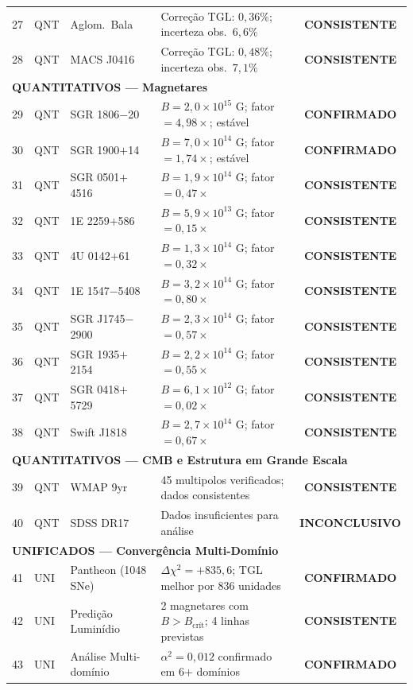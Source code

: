 \documentclass[12pt,a4paper,twoside]{article}
\newcommand{\alphaii}{\alpha^{2}}
\newcommand{\confirmed}{\textcolor{tglgreen}{\textbf{CONFIRMADO}}}
\newcommand{\consistent}{\textcolor{tglblue}{\textbf{CONSISTENTE}}}
\newcommand{\inconclusive}{\textcolor{tglgray}{\textbf{INCONCLUSIVO}}}
\begin{document}
\begin{small}
\begin{longtable}{clp{3.5cm}p{4.5cm}c}
27 & QNT & Aglom.\ Bala          & Corre\c{c}\~ao TGL: $0{,}36\%$; incerteza obs.\ $6{,}6\%$  & \consistent \\
28 & QNT & MACS J0416            & Corre\c{c}\~ao TGL: $0{,}48\%$; incerteza obs.\ $7{,}1\%$  & \consistent \\
%
\midrule
\multicolumn{5}{l}{\textbf{QUANTITATIVOS --- Magnetares}} \\
\midrule
29 & QNT & SGR 1806$-$20         & $B = 2{,}0 \times 10^{15}$ G; fator $= 4{,}98\times$; est\'avel & \confirmed \\
30 & QNT & SGR 1900$+$14         & $B = 7{,}0 \times 10^{14}$ G; fator $= 1{,}74\times$; est\'avel & \confirmed \\
31 & QNT & SGR 0501$+$4516       & $B = 1{,}9 \times 10^{14}$ G; fator $= 0{,}47\times$           & \consistent \\
32 & QNT & 1E 2259$+$586         & $B = 5{,}9 \times 10^{13}$ G; fator $= 0{,}15\times$           & \consistent \\
33 & QNT & 4U 0142$+$61          & $B = 1{,}3 \times 10^{14}$ G; fator $= 0{,}32\times$           & \consistent \\
34 & QNT & 1E 1547$-$5408        & $B = 3{,}2 \times 10^{14}$ G; fator $= 0{,}80\times$           & \consistent \\
35 & QNT & SGR J1745$-$2900      & $B = 2{,}3 \times 10^{14}$ G; fator $= 0{,}57\times$           & \consistent \\
36 & QNT & SGR 1935$+$2154       & $B = 2{,}2 \times 10^{14}$ G; fator $= 0{,}55\times$           & \consistent \\
37 & QNT & SGR 0418$+$5729       & $B = 6{,}1 \times 10^{12}$ G; fator $= 0{,}02\times$           & \consistent \\
38 & QNT & Swift J1818            & $B = 2{,}7 \times 10^{14}$ G; fator $= 0{,}67\times$           & \consistent \\
%
\midrule
\multicolumn{5}{l}{\textbf{QUANTITATIVOS --- CMB e Estrutura em Grande Escala}} \\
\midrule
39 & QNT & WMAP 9yr              & 45 multipolos verificados; dados consistentes                  & \consistent \\
40 & QNT & SDSS DR17             & Dados insuficientes para an\'alise                              & \inconclusive \\
%
\midrule
\multicolumn{5}{l}{\textbf{UNIFICADOS --- Converg\^encia Multi-Dom\'inio}} \\
\midrule
41 & UNI & Pantheon (1048 SNe)   & $\Delta\chi^2 = +835{,}6$; TGL melhor por 836 unidades          & \confirmed \\
42 & UNI & Predi\c{c}\~ao Lumin\'idio & 2 magnetares com $B > B_{\text{cr\'it}}$; 4 linhas previstas  & \consistent \\
43 & UNI & An\'alise Multi-dom\'inio & $\alphaii = 0{,}012$ confirmado em 6+ dom\'inios               & \confirmed \\
\end{longtable}
\end{small}
\end{document}
